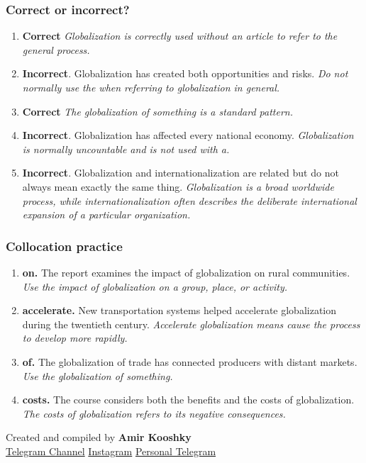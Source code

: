 \documentclass[11pt]{article}
\begin{document}
\subsubsection{Correct or incorrect?}
\begin{enumerate}
  \item \textbf{Correct} \emph{Globalization is correctly used without an article to refer to the general process.}
  \item \textbf{Incorrect}. Globalization has created both opportunities and risks. \emph{Do not normally use the when referring to globalization in general.}
  \item \textbf{Correct} \emph{The globalization of something is a standard pattern.}
  \item \textbf{Incorrect}. Globalization has affected every national economy. \emph{Globalization is normally uncountable and is not used with a.}
  \item \textbf{Incorrect}. Globalization and internationalization are related but do not always mean exactly the same thing. \emph{Globalization is a broad worldwide process, while internationalization often describes the deliberate international expansion of a particular organization.}
\end{enumerate}

\subsubsection{Collocation practice}
\begin{enumerate}
  \item \textbf{on.} The report examines the impact of globalization on rural communities. \emph{Use the impact of globalization on a group, place, or activity.}
  \item \textbf{accelerate.} New transportation systems helped accelerate globalization during the twentieth century. \emph{Accelerate globalization means cause the process to develop more rapidly.}
  \item \textbf{of.} The globalization of trade has connected producers with distant markets. \emph{Use the globalization of something.}
  \item \textbf{costs.} The course considers both the benefits and the costs of globalization. \emph{The costs of globalization refers to its negative consequences.}
\end{enumerate}

\vfill
\begin{center}
\small\color{Muted} Created and compiled by \textbf{Amir Kooshky}\\
\href{https://t.me/KooshkyTOEFL}{Telegram Channel}\quad\textbullet\quad
\href{https://www.instagram.com/kooshkytoefl}{Instagram}\quad\textbullet\quad
\href{https://t.me/KooshkyTOEFL\_pv}{Personal Telegram}
\end{center}
\end{document}
